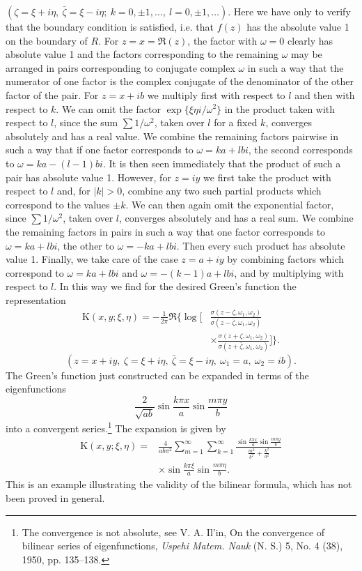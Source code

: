 $(\zeta=\xi+i\eta,\ \bar\zeta=\xi-i\eta;\ k=0,\pm1,\ldots,\ l=0,\pm1,\ldots)$. Here we have only to verify that the boundary condition is satisfied, i.e. that $f(z)$ has the absolute value 1 on the boundary of $R$. For $z=x=\Re(z)$, the factor with $\omega=0$ clearly has absolute value 1 and the factors corresponding to the remaining $\omega$ may be arranged in pairs corresponding to conjugate complex $\omega$ in such a way that the numerator of one factor is the complex conjugate of the denominator of the other factor of the pair. For $z=x+ib$ we multiply first with respect to $l$ and then with respect to $k$. We can omit the factor $\exp\{\xi\eta i/\omega^2\}$ in the product taken with respect to $l$, since the sum $\sum1/\omega^2$, taken over $l$ for a fixed $k$, converges absolutely and has a real value. We combine the remaining factors pairwise in such a way that if one factor corresponds to $\omega=ka+lbi$, the second corresponds to $\omega=ka-(l-1)bi$. It is then seen immediately that the product of such a pair has absolute value 1. However, for $z=iy$ we first take the product with respect to $l$ and, for $|k|>0$, combine any two such partial products which correspond to the values $\pm k$. We can then again omit the exponential factor, since $\sum1/\omega^2$, taken over $l$, converges absolutely and has a real sum. We combine the remaining factors in pairs in such a way that one factor corresponds to $\omega=ka+lbi$, the other to $\omega=-ka+lbi$. Then every such product has absolute value 1. Finally, we take care of the case $z=a+iy$ by combining factors which correspond to $\omega=ka+lbi$ and $\omega=-(k-1)a+lbi$, and by multiplying with respect to $l$. In this way we find for the desired Green's function the representation
\[
\begin{aligned}
\mathrm K(x,y;\xi,\eta)
=-\frac1{2\pi}\Re\Bigg\{\log\Bigg[&
\frac{\sigma(z-\zeta,\omega_1,\omega_2)}{\sigma(z-\bar\zeta,\omega_1,\omega_2)}\\
&\times\frac{\sigma(z+\zeta,\omega_1,\omega_2)}{\sigma(z+\bar\zeta,\omega_1,\omega_2)}\Bigg]\Bigg\}.
\end{aligned}
\]
\[
(z=x+iy,\ \zeta=\xi+i\eta,\ \bar\zeta=\xi-i\eta,\ \omega_1=a,\ \omega_2=ib).
\]
The Green's function just constructed can be expanded in terms of the eigenfunctions
\[
\frac{2}{\sqrt{ab}}\sin\frac{k\pi x}{a}\sin\frac{m\pi y}{b}
\]
into a convergent series.\footnote{The convergence is not absolute, see V. A. Il'in, On the convergence of bilinear series of eigenfunctions, \emph{Uspehi Matem. Nauk} (N. S.) 5, No. 4 (38), 1950, pp. 135--138.} The expansion is given by
\[
\begin{aligned}
\mathrm K(x,y;\xi,\eta)
={}&\frac4{ab\pi^2}\sum_{m=1}^{\infty}\sum_{k=1}^{\infty}
\frac{\sin\frac{k\pi x}{a}\sin\frac{m\pi y}{b}}{\frac{m^2}{b^2}+\frac{k^2}{a^2}}\\
&\times\sin\frac{k\pi\xi}{a}\sin\frac{m\pi\eta}{b}.
\end{aligned}
\]
This is an example illustrating the validity of the bilinear formula, which has not been proved in general.

